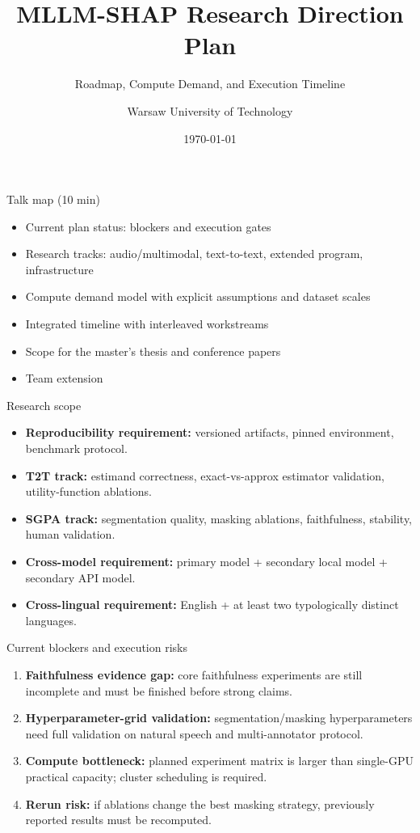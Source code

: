 \documentclass[aspectratio=169]{beamer}
\title{MLLM-SHAP Research Direction Plan}
\subtitle{Roadmap, Compute Demand, and Execution Timeline}
\author{Warsaw University of Technology}
\date{\today}
\begin{document}
\begin{frame}
  \titlepage
\end{frame}

\begin{frame}{Talk map (10 min)}
  \begin{itemize}
    \item Current plan status: blockers and execution gates
    \item Research tracks: audio/multimodal, text-to-text, extended program, infrastructure
    \item Compute demand model with explicit assumptions and dataset scales
    \item Integrated timeline with interleaved workstreams
    \item Scope for the master's thesis and conference papers
    \item Team extension
  \end{itemize}
\end{frame}

\begin{frame}{Research scope}
  \begin{itemize}
    \item \textbf{Reproducibility requirement:} versioned artifacts, pinned environment, benchmark protocol.
    \item \textbf{T2T track:} estimand correctness, exact-vs-approx estimator validation, utility-function ablations.
    \item \textbf{SGPA track:} segmentation quality, masking ablations, faithfulness, stability, human validation.
    \item \textbf{Cross-model requirement:} primary model + secondary local model + secondary API model.
    \item \textbf{Cross-lingual requirement:} English + at least two typologically distinct languages.
  \end{itemize}
\end{frame}

\begin{frame}{Current blockers and execution risks}
  \begin{enumerate}
    \item \textbf{Faithfulness evidence gap:} core faithfulness experiments are still incomplete and must be finished before strong claims.
    \item \textbf{Hyperparameter-grid validation:} segmentation/masking hyperparameters need full validation on natural speech and multi-annotator protocol.
    \item \textbf{Compute bottleneck:} planned experiment matrix is larger than single-GPU practical capacity; cluster scheduling is required.
    \item \textbf{Rerun risk:} if ablations change the best masking strategy, previously reported results must be recomputed.
  \end{enumerate}
\end{frame}
\end{document}
